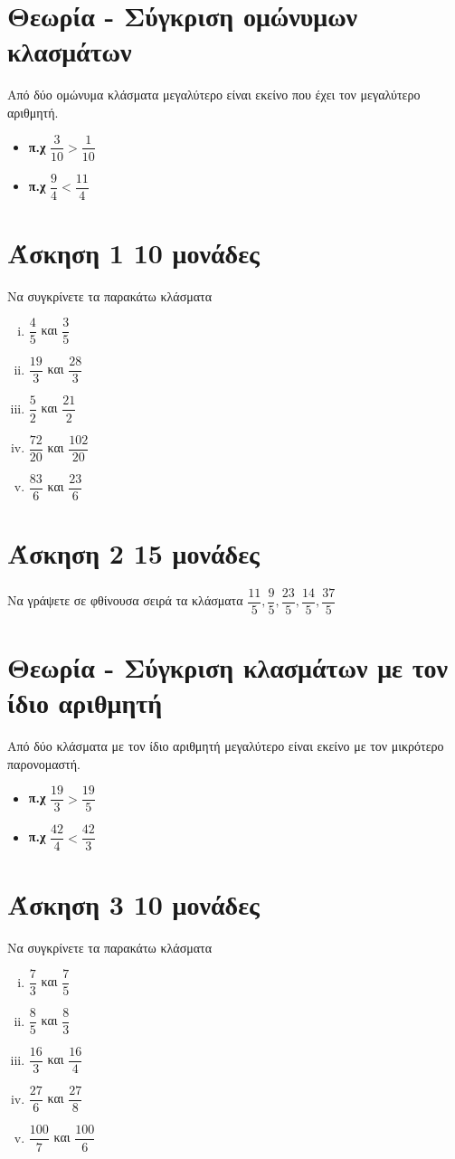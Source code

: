 \documentclass[a4paper,10pt]{report}
\begin{document}
\section*{Θεωρία - Σύγκριση ομώνυμων κλασμάτων\hfill \small{}}
Από δύο ομώνυμα κλάσματα μεγαλύτερο είναι εκείνο που έχει τον μεγαλύτερο αριθμητή.
\begin{itemize}
 \item \textbf{π.χ} $\dfrac{3}{10}>\dfrac{1}{10}$
 \item \textbf{π.χ} $\dfrac{9}{4}<\dfrac{11}{4}$
\end{itemize}


\section*{Άσκηση 1  \hfill \small{10 μονάδες}}
Να συγκρίνετε τα παρακάτω κλάσματα 
\begin{enumerate}[i)]
 \item $\dfrac{4}{5}$ και $\dfrac{3}{5}$
 \item $\dfrac{19}{3}$ και $\dfrac{28}{3}$
 \item $\dfrac{5}{2}$ και $\dfrac{21}{2}$
 \item $\dfrac{72}{20}$ και $\dfrac{102}{20}$
 \item $\dfrac{83}{6}$ και $\dfrac{23}{6}$
\end{enumerate}

\section*{Άσκηση 2  \hfill \small{15 μονάδες}}
Να γράψετε σε φθίνουσα σειρά τα  κλάσματα
$ \dfrac{11}{5}, \dfrac{9}{5}, \dfrac{23}{5}, \dfrac{14}{5}, \dfrac{37}{5} $

\section*{Θεωρία - Σύγκριση κλασμάτων με τον ίδιο αριθμητή\hfill \small{}}
Από δύο  κλάσματα με τον ίδιο αριθμητή μεγαλύτερο είναι εκείνο με τον μικρότερο παρονομαστή.
\begin{itemize}
 \item \textbf{π.χ} $\dfrac{19}{3}>\dfrac{19}{5}$
 \item \textbf{π.χ} $\dfrac{42}{4}<\dfrac{42}{3}$
\end{itemize}


\section*{Άσκηση 3  \hfill \small{10 μονάδες}}
Να συγκρίνετε τα παρακάτω κλάσματα 
\begin{enumerate}[i)]
 \item $\dfrac{7}{3}$ και $\dfrac{7}{5}$
 \item $\dfrac{8}{5}$ και $\dfrac{8}{3}$
 \item $\dfrac{16}{3}$ και $\dfrac{16}{4}$
 \item $\dfrac{27}{6}$ και $\dfrac{27}{8}$
 \item $\dfrac{100}{7}$ και $\dfrac{100}{6}$
\end{enumerate}
\end{document}
